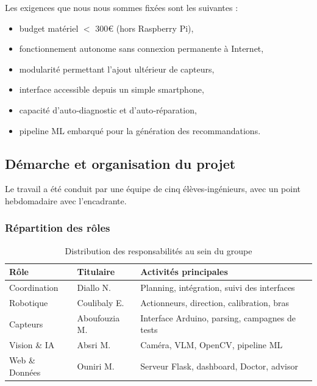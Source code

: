 \documentclass[a4paper,12pt,openany,titlepage]{scrartcl}
\begin{document}
Les exigences que nous nous sommes fixées sont les suivantes :
\begin{itemize}[nosep]
    \item budget matériel $<$ 300\euro{} (hors Raspberry Pi),
    \item fonctionnement autonome sans connexion permanente à Internet,
    \item modularité permettant l’ajout ultérieur de capteurs,
    \item interface accessible depuis un simple smartphone,
    \item capacité d’auto‑diagnostic et d’auto‑réparation,
    \item pipeline ML embarqué pour la génération des recommandations.
\end{itemize}

\subsection{Démarche et organisation du projet}

Le travail a été conduit par une équipe de cinq élèves‑ingénieurs, avec un point hebdomadaire avec l’encadrante.

\subsubsection{Répartition des rôles}

\begin{table}[H]
\centering
\begin{tabular}{|l|l|p{6cm}|}
\hline
\textbf{Rôle} & \textbf{Titulaire} & \textbf{Activités principales} \\
\hline
Coordination & Diallo N. & Planning, intégration, suivi des interfaces \\
Robotique & Coulibaly E. & Actionneurs, direction, calibration, bras \\
Capteurs & Aboufouzia M. & Interface Arduino, parsing, campagnes de tests \\
Vision \& IA & Absri M. & Caméra, VLM, OpenCV, pipeline ML \\
Web \& Données & Ouniri M. & Serveur Flask, dashboard, Doctor, advisor \\
\hline
\end{tabular}
\caption{Distribution des responsabilités au sein du groupe}
\end{table}
\end{document}
